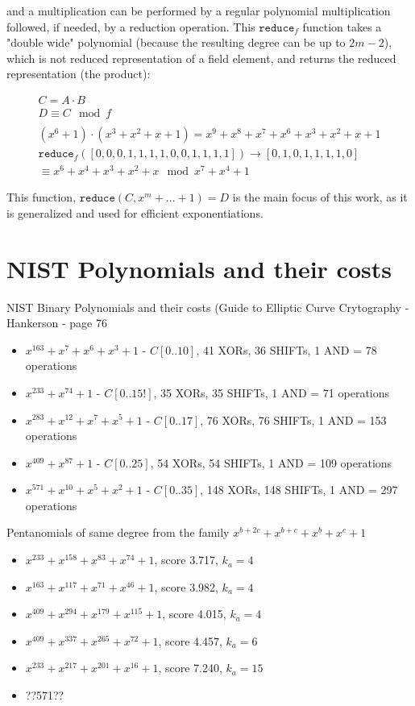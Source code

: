 and a multiplication can be performed by a regular polynomial multiplication followed, if needed, by a reduction operation. This $\texttt{reduce}_f$ function takes a "double wide" polynomial (because the resulting degree can be up to $2m-2$), which is not reduced representation of a field element, and returns the reduced representation (the product):

\begin{gather*}
C = A \cdot B\\
D \equiv C \mod f\\
\\
(x^6+1) \cdot (x^3+x^2+x+1) = x^9 + x^8 + x^7 + x^6 + x^3 + x^2 + x + 1 \\
\texttt{reduce}_f([0, 0, 0, 1, 1, 1, 1, 0, 0, 1, 1, 1, 1]) \rightarrow [0, 1, 0, 1, 1, 1, 1, 0]\\
\equiv x^6 + x^4 + x^3 + x^2 + x \mod x^7+x^4+1
\end{gather*}

This function, $\texttt{reduce}(C, x^m+...+1) = D$ is the main focus of this work, as it is generalized and used for efficient exponentiations.


\section{NIST Polynomials and their costs}

NIST Binary Polynomials and their costs (Guide to Elliptic Curve Crytography - Hankerson - page 76

\begin{itemize}
\item $x^{163} + x^7 + x^6 + x^3 + 1$ - $C[0..10]$, 41 XORs, 36 SHIFTs, 1 AND = 78 operations
\item $x^{233} + x^{74} + 1$ - $C[0..15!]$, 35 XORs, 35 SHIFTs, 1 AND = 71 operations
\item $x^{283} + x^{12} + x^7 + x^5 + 1$ - $C[0..17]$, 76 XORs, 76 SHIFTs, 1 AND = 153 operations
\item $x^{409} + x^{87} + 1$ - $C[0..25]$, 54 XORs, 54 SHIFTs, 1 AND = 109 operations
\item $x^{571} + x^{10} + x^5 + x^2 + 1$ - $C[0..35]$, 148 XORs, 148 SHIFTs, 1 AND = 297 operations
\end{itemize}


Pentanomials of same degree from the family $x^{b+2c} + x^{b+c} + x^b + x^c + 1$

\begin{itemize}
\item $x^{233} + x^{158} + x^{83} + x^{74} + 1$, score 3.717, $k_a=4$
\item $x^{163} + x^{117} + x^{71} + x^{46} + 1$, score 3.982, $k_a=4$
\item $x^{409} + x^{294} + x^{179} + x^{115} + 1$, score 4.015, $k_a=4$
\item $x^{409} + x^{337} + x^{265} + x^{72} + 1$, score 4.457, $k_a=6$
\item $x^{233} + x^{217} + x^{201} + x^{16} + 1$, score 7.240, $k_a=15$
\item ??571??
\end{itemize}

